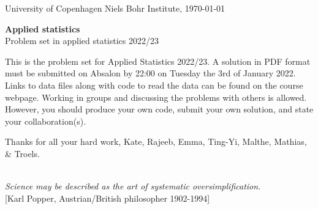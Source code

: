 \documentclass[11pt]{article}
\begin{document}

\noindent
University of Copenhagen \hfill
Niels Bohr Institute, \today \par
\vspace{-2ex}
\noindent
\hrulefill

\vspace{1ex}
\begin{center}
{\bf {\Huge Applied statistics}}\\
\vspace{1ex}
{\large Problem set in applied statistics 2022/23}
\end{center}

\vspace{0ex}
\noindent
This is the problem set for Applied Statistics 2022/23. A solution in PDF format must be submitted on Absalon by 22:00 on Tuesday the 3rd of January 2022. Links to data files along with code to read the data can be found on the course webpage. Working in groups and discussing the problems with others is allowed. However, you should produce your own code, submit your own solution, and state your collaboration(s).

\vspace{-1ex}
\begin{center}
  Thanks for all your hard work, Kate, Rajeeb, Emma, Ting-Yi, Malthe, Mathias, \& Troels.
\end{center}


\noindent
\hrulefill\\
\emph{Science may be described as the art of systematic oversimplification.}\\
  \phantom{foobar} \hfill [Karl Popper, Austrian/British philosopher 1902-1994]\\[-2ex]

\vspace{-2ex}
\noindent
\hrulefill
\end{document}

